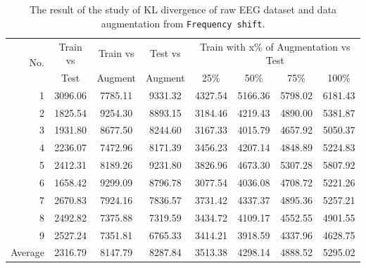 \begin{table}[ht!]
    \centering
    \caption[The result of KL divergence]{The result of the study of KL divergence of raw EEG dataset and data augmentation from \texttt{Frequency shift}.}
    \label{tab:KL-FrequencyShift}
        {\small\begin{tabular}{rccccccc}
        \hline
        \multirow{2}{*}{No.} & Train vs & Train vs & Test vs & \multicolumn{4}{c}{Train with x\% of Augmentation vs Test} \\ 
        \cline{5-8} 
                             & Test     & Augment  & Augment & 25\%          & 50\%         & 75\%         & 100\%        \\
        \hline
        1                    & 3096.06  & 7785.11  & 9331.32 & 4327.54       & 5166.36      & 5798.02      & 6181.43      \\
        2                    & 1825.54  & 9254.30  & 8893.15 & 3184.46       & 4219.43      & 4890.00      & 5381.87      \\
        3                    & 1931.80  & 8677.50  & 8244.60 & 3167.33       & 4015.79      & 4657.92      & 5050.37      \\
        4                    & 2236.07  & 7472.96  & 8171.39 & 3456.23       & 4207.14      & 4848.89      & 5224.83      \\
        5                    & 2412.31  & 8189.26  & 9231.80 & 3826.96       & 4673.30      & 5307.28      & 5807.92      \\
        6                    & 1658.42  & 9299.09  & 8796.78 & 3077.54       & 4036.08      & 4708.72      & 5221.26      \\
        7                    & 2670.83  & 7924.16  & 7836.57 & 3731.42       & 4337.37      & 4895.36      & 5257.21      \\
        8                    & 2492.82  & 7375.88  & 7319.59 & 3434.72       & 4109.17      & 4552.55      & 4901.55      \\
        9                    & 2527.24  & 7351.81  & 6765.33 & 3414.21       & 3918.59      & 4337.96      & 4628.75      \\\hline
        Average              & 2316.79  & 8147.79  & 8287.84 & 3513.38       & 4298.14      & 4888.52      & 5295.02      \\
        \hline
        \end{tabular}}
\end{table}

